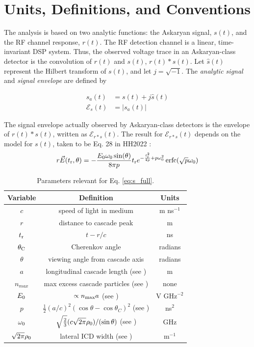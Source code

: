 \documentclass[amsmath,amssymb,aps,prd,10pt,twocolumn,showkeys]{revtex4}
\DeclareMathOperator\erfc{erfc}
\begin{document}
\section{Units, Definitions, and Conventions}
\label{sec:unit}

The analysis is based on two analytic functions: the Askaryan signal, $s(t)$, and the RF channel response, $r(t)$.  The RF detection channel is a linear, time-invariant DSP system.  Thus, the observed voltage trace in an Askaryan-class detector is the convolution of $r(t)$ and $s(t)$, $r(t) * s(t)$.  Let $\hat{s}(t)$ represent the Hilbert transform of $s(t)$, and let $j=\sqrt{-1}$.  The \textit{analytic signal} and \textit{signal envelope} are defined by 

\begin{align}
s_a(t) &= s(t) + j\hat{s}(t) \\
\mathcal{E}_s(t) &= |s_a(t)|
\end{align}

The signal envelope actually observed by Askaryan-class detectors is the envelope of $r(t) * s(t)$, written as $\mathcal{E}_{r*s}(t)$.  The result for $\mathcal{E}_{r*s}(t)$ depends on the model for $s(t)$, taken to be Eq. 28 in HH2022 \cite{PhysRevD.105.123019}:
\begin{equation}
r\vec{E}(t_{\rm r},\theta) = -\frac{E_0\omega_0 \sin(\theta)}{8\pi p}t_{\rm r}e^{-\frac{t_{\rm r}^2}{4p}+p\omega_0^2}\erfc(\sqrt{p}\omega_0) \label{eq:s_full}
\end{equation}
\begin{table}
\begin{tabular}{| c | c | c |} \hline
\textbf{Variable} & \textbf{Definition} & \textbf{Units}\\ \hline
$c$ & speed of light in medium & m ns$^{-1}$ \\ 
$r$ & distance to cascade peak & m \\
$t_{\rm r}$ & $t-r/c$ & ns \\
$\theta_{\rm C}$ & Cherenkov angle & radians \\ 
$\theta$ & viewing angle from cascade axis & radians \\ 
$a$ & longitudinal cascade length (see \cite{10.1103/physrevd.65.016003}) & m \\ 
$n_{max}$ & max excess cascade particles (see \cite{10.1103/physrevd.65.016003})  & none \\
$E_{\rm 0}$ & $\propto n_{\rm max}a$ (see \cite{10.1103/physrevd.65.016003}) & V GHz$^{-2}$ \\
$p$ & $\frac{1}{2}(a/c)^2 \left(\cos\theta - \cos\theta_C\right)^2$ (see \cite{PhysRevD.105.123019}) & ns$^2$ \\ 
$\omega_{\rm 0}$ & $\sqrt{\frac{2}{3}} (c\sqrt{2\pi}\rho_{\rm 0})/(\sin\theta)$ (see \cite{10.1016/j.astropartphys.2017.03.008}) & GHz \\
$\sqrt{2\pi}\rho_{\rm 0}$ & lateral ICD width (see \cite{10.1016/j.astropartphys.2017.03.008}) & m$^{-1}$ \\ \hline
\end{tabular}
\caption{\label{tab:param} Parameters relevant for Eq. \ref{eq:s_full}.}
\end{table}
\end{document}
